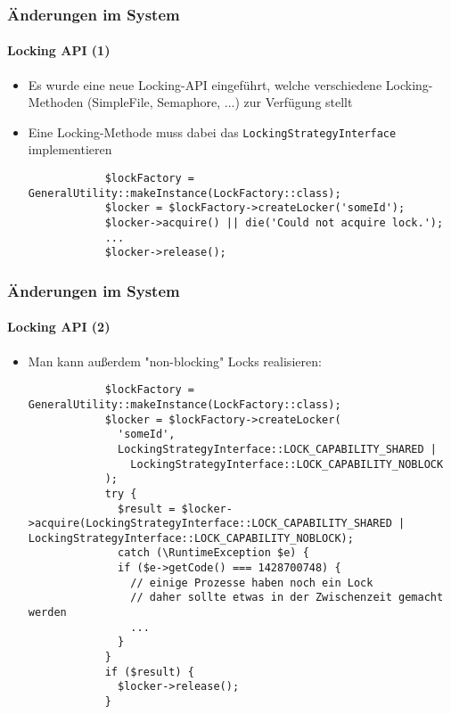 \begin{frame}[fragile]
	\frametitle{Änderungen im System}
	\framesubtitle{Locking API (1)}

	\begin{itemize}

		\item Es wurde eine neue Locking-API eingeführt, welche verschiedene Locking-Methoden (SimpleFile, Semaphore, ...) zur Verfügung stellt
		\item Eine Locking-Methode muss dabei das \texttt{LockingStrategyInterface} implementieren
		\begin{lstlisting}
			$lockFactory = GeneralUtility::makeInstance(LockFactory::class);
			$locker = $lockFactory->createLocker('someId');
			$locker->acquire() || die('Could not acquire lock.');
			...
			$locker->release();
		\end{lstlisting}

	\end{itemize}

\end{frame}

\begin{frame}[fragile]
	\frametitle{Änderungen im System}
	\framesubtitle{Locking API (2)}

	\lstset{basicstyle=\tiny\ttfamily}

	\begin{itemize}

		\item Man kann außerdem "non-blocking" Locks realisieren:

		\begin{lstlisting}
			$lockFactory = GeneralUtility::makeInstance(LockFactory::class);
			$locker = $lockFactory->createLocker(
			  'someId',
			  LockingStrategyInterface::LOCK_CAPABILITY_SHARED |
			    LockingStrategyInterface::LOCK_CAPABILITY_NOBLOCK
			);
			try {
			  $result = $locker->acquire(LockingStrategyInterface::LOCK_CAPABILITY_SHARED | LockingStrategyInterface::LOCK_CAPABILITY_NOBLOCK);
			  catch (\RuntimeException $e) {
			  if ($e->getCode() === 1428700748) {
			    // einige Prozesse haben noch ein Lock
			    // daher sollte etwas in der Zwischenzeit gemacht werden
			    ...
			  }
			}
			if ($result) {
			  $locker->release();
			}
		\end{lstlisting}

	\end{itemize}

\end{frame}


